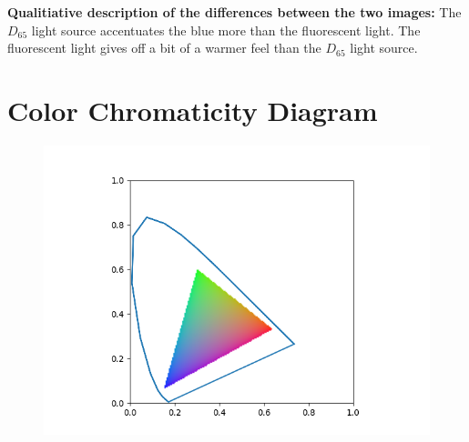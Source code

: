 \documentclass{article}
\begin{document}
\pagebreak
\noindent
\textbf{Qualitiative description of the differences between the two images:}
The $D_{65}$ light source accentuates the blue more than the fluorescent light. The fluorescent light gives off a bit of a warmer feel than the $D_{65}$ light source.

\section{Color Chromaticity Diagram}
\begin{figure}[H]
    \centering
    \includegraphics[width=1\textwidth]{../5-outlined-chromaticity-plot.png}
\end{figure}
\end{document}
